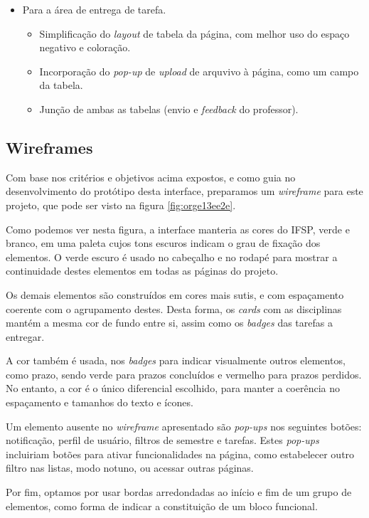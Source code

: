 \documentclass[11pt]{article}
\begin{document}
\begin{itemize}
\item Para a área de entrega de tarefa.
\begin{itemize}
\item Simplificação do \emph{layout} de tabela da página, com melhor uso do
espaço negativo e coloração.
\item Incorporação do \emph{pop-up} de \emph{upload} de arquvivo à página, como um
campo da tabela.
\item Junção de ambas as tabelas (envio e \emph{feedback} do professor).
\end{itemize}
\end{itemize}

\subsection*{Wireframes}
\label{sec:org1f21af1}
Com base nos critérios e objetivos acima expostos, e como guia no
desenvolvimento do protótipo desta interface, preparamos um
\emph{wireframe} para este projeto, que pode ser visto na figura \ref{fig:orge13ee2e}.

Como podemos ver nesta figura, a interface manteria as cores do IFSP,
verde e branco, em uma paleta cujos tons escuros indicam o grau de
fixação dos elementos. O verde escuro é usado no cabeçalho e no rodapé
para mostrar a continuidade destes elementos em todas as páginas do
projeto.

Os demais elementos são construídos em cores mais sutis, e com
espaçamento coerente com o agrupamento destes. Desta forma, os \emph{cards}
com as disciplinas mantém a mesma cor de fundo entre si, assim como os
\emph{badges} das tarefas a entregar.

A cor também é usada, nos \emph{badges} para indicar visualmente outros elementos, como
prazo, sendo verde para prazos concluídos e vermelho para prazos
perdidos. No entanto, a cor é o único diferencial escolhido, para
manter a coerência no espaçamento e tamanhos do texto e ícones.

Um elemento ausente no \emph{wireframe} apresentado são \emph{pop-ups} nos
seguintes botões: notificação, perfil de usuário, filtros de semestre
e tarefas. Estes \emph{pop-ups} incluiriam botões para ativar
funcionalidades na página, como estabelecer outro filtro nas listas,
modo notuno, ou acessar outras páginas.

Por fim, optamos por usar bordas arredondadas ao início e fim de um
grupo de elementos, como forma de indicar a constituição de um bloco
funcional.
\end{document}
